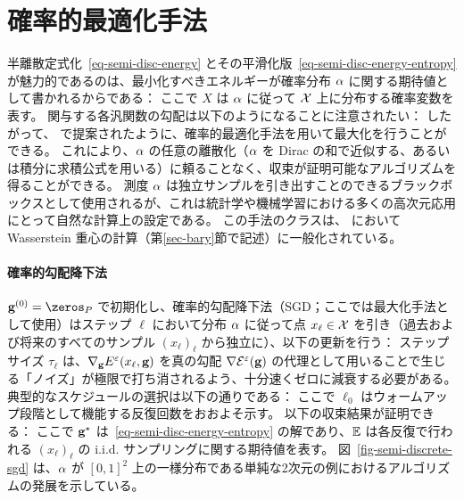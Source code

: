 \section{確率的最適化手法}
\label{sec-sgd}

半離散定式化~\eqref{eq-semi-disc-energy} とその平滑化版~\eqref{eq-semi-disc-energy-entropy} が魅力的であるのは、最小化すべきエネルギーが確率分布 $\alpha$ に関する期待値として書かれるからである：
ここで $X$ は $\alpha$ に従って $\mathcal{X}$ 上に分布する確率変数を表す。
関与する各汎関数の勾配は以下のようになることに注意されたい：
したがって、\citet{genevay2016stochastic} で提案されたように、確率的最適化手法を用いて最大化を行うことができる。
これにより、$\alpha$ の任意の離散化（$\alpha$ を Dirac の和で近似する、あるいは積分に求積公式を用いる）に頼ることなく、収束が証明可能なアルゴリズムを得ることができる。
測度 $\alpha$ は独立サンプルを引き出すことのできるブラックボックスとして使用されるが、これは統計学や機械学習における多くの高次元応用にとって自然な計算上の設定である。
この手法のクラスは、\citep{staib2017parallel} において Wasserstein 重心の計算（第\ref{sec-bary}節で記述）に一般化されている。

\paragraph{確率的勾配降下法}

$\gD^{(0)} = \zeros_{P}$ で初期化し、確率的勾配降下法（SGD；ここでは最大化手法として使用）はステップ $\ell$ において分布 $\alpha$ に従って点 $x_\ell \in \mathcal{X}$ を引き（過去および将来のすべてのサンプル $(x_\ell)_\ell$ から独立に）、以下の更新を行う：
ステップサイズ $\tau_\ell$ は、$\nabla_{\mathrm{\textbf{g}}} E^\varepsilon(x_\ell,\mathrm{\textbf{g}})$ を真の勾配 $\nabla \mathcal{E}^\varepsilon(\mathrm{\textbf{g}})$ の代理として用いることで生じる「ノイズ」が極限で打ち消されるよう、十分速くゼロに減衰する必要がある。
典型的なスケジュールの選択は以下の通りである：
ここで $\ell_0$ はウォームアップ段階として機能する反復回数をおおよそ示す。
以下の収束結果が証明できる：
ここで $\mathrm{\textbf{g}}^\star$ は~\eqref{eq-semi-disc-energy-entropy} の解であり、$\mathbb{E}$ は各反復で行われる $(x_\ell)_\ell$ の i.i.d. サンプリングに関する期待値を表す。
図~\ref{fig-semi-discrete-sgd} は、$\alpha$ が $[0,1]^2$ 上の一様分布である単純な2次元の例におけるアルゴリズムの発展を示している。


